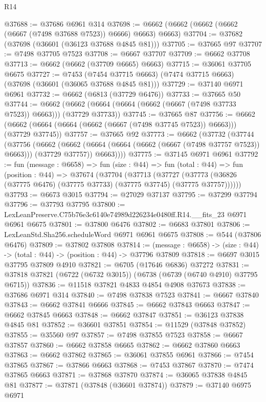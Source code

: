 \begin{lexlean}{R14}
\begin{coremodule}
@37688 := @37686 @6961 @314
@37698 := @6662 (@6662 (@6662 (@6662 (@6667 (@7498 @37688 @7523)) @6666) @6663) @6663)
@37704 := @37682 (@37698 (@36601 (@36123 @37688 @4845 @81)))
@37705 := @37665 @97
@37707 := @7498 @37705 @7523
@37708 := @6667 @37707
@37709 := @6662 @37708
@37713 := @6662 (@6662 (@37709 @6665) @6663)
@37715 := @36061 @37705 @6675
@37727 := @7453
    (@7454 @37715 @6663)
    (@7474 @37715 @6663)
    (@37698 (@36601 (@36065 @37688 @4845 @81)))
@37729 := @37140 @6971 @6961
@37732 := @6662 (@6813 (@37729 @6476))
@37733 := @37665 @50
@37744 := @6662 (@6662 (@6664 (@6664 (@6662 (@6667 (@7498 @37733 @7523)) @6663))) (@37729 @37733))
@37745 := @37665 @87
@37756 := @6662 (@6662 (@6664 (@6664 (@6662 (@6667 (@7498 @37745 @7523)) @6663))) (@37729 @37745))
@37757 := @37665 @92
@37773 := @6662
    (@37732
      (@37744
        (@37756
          (@6662
            (@6662 (@6664 (@6664 (@6662 (@6667 (@7498 @37757 @7523)) @6663))) (@37729 @37757))
            @6663))))
@37775 := @37145 @6971 @6961
@37792 := fun (message : @6658) =>
  fun (size : @44) =>
  fun (total : @44) =>
  fun (position : @44) =>
  @37674
    (@37704
      (@37713
        (@37727 (@37773 (@36826 (@37775 @6476) (@37775 @37733) (@37775 @37745) (@37775 @37757))))))
@37793 := @6673 @3015
@37794 := @27029 @37137
@37795 := @37299 @37794
@37796 := @37793 @37795
@37800 := LexLeanPreserve.C75b76e3c6140e74989d226234e0480ff.R14.__fits_23 @6971 @6961 @6675
@37801 := @37800 @6476
@37802 := @6683 @37801
@37806 := LexLeanStd.Sha256.scheduleWord @6971 @6961 @6675
@37808 := @544 (@37806 @6476)
@37809 := @37802 @37808
@37814 := (message : @6658) -> (size : @44) -> (total : @44) -> (position : @44) -> @37796 @37809
@37818 := @6697 @3015 @37795 @37809 @4910
@37821 := @6705 (@17646 @6836) @37272
@37831 := @37818 @37821 (@6722 (@6732 @3015)) (@6738 (@6739 (@6740 @4910) @37795 @6715))
@37836 := @11518 @37821 @4833 @4854 @4908 @37673
@37838 := @37686 @6971 @314
@37840 := @7498 @37838 @7523
@37841 := @6667 @37840
@37843 := @6662 @37841 @6666
@37845 := @6662 @37843 @6663
@37847 := @6662 @37845 @6663
@37848 := @6662 @37847
@37851 := @36123 @37838 @4845 @81
@37852 := @36601 @37851
@37854 := @11529 (@37848 @37852)
@37855 := @35560 @97
@37857 := @7498 @37855 @7523
@37858 := @6667 @37857
@37860 := @6662 @37858 @6665
@37862 := @6662 @37860 @6663
@37863 := @6662 @37862
@37865 := @36061 @37855 @6961
@37866 := @7454 @37865
@37867 := @37866 @6663
@37868 := @7453 @37867
@37870 := @7474 @37865 @6663
@37871 := @37868 @37870
@37874 := @36065 @37838 @4845 @81
@37877 := @37871 (@37848 (@36601 @37874))
@37879 := @37140 @6975 @6971

\end{coremodule}
\end{lexlean}
